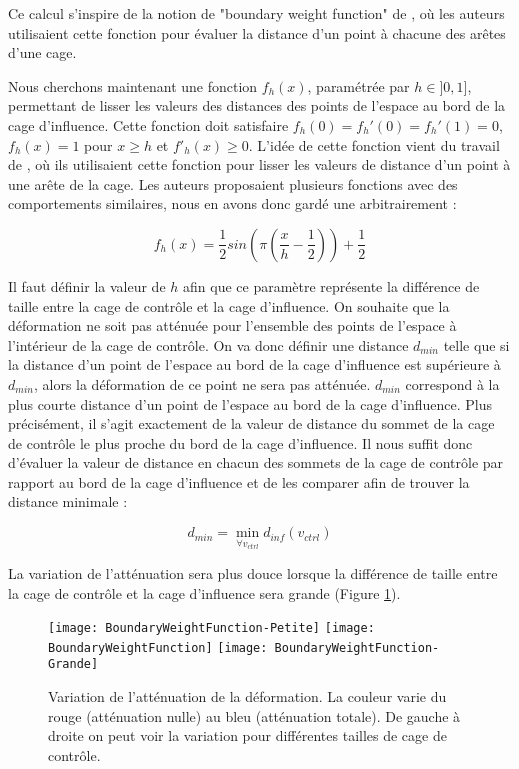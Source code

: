 Ce calcul s'inspire de la notion de "boundary weight function" de
\cite{GPCP13}, où les auteurs utilisaient cette fonction pour évaluer la
distance d'un point à chacune des arêtes d'une cage.

Nous cherchons maintenant une fonction $f_h(x)$, paramétrée par $h \in ]0,
1]$, permettant de lisser les valeurs des distances des points de l'espace au
bord de la cage d'influence. Cette fonction doit satisfaire $f_h(0) = f_h'(0)
= f_h'(1) = 0$, $f_h(x)=1$ pour $x \geq h$ et $f'_h(x) \geq 0$. L'idée de
cette fonction vient du travail de \cite{GPCP13}, où ils utilisaient cette
fonction pour lisser les valeurs de distance d'un point à une arête de la
cage. Les auteurs proposaient plusieurs fonctions avec des comportements
similaires, nous en avons donc gardé une arbitrairement :

\begin{equation}
  f_h(x) = \frac{1}{2} sin(\pi(\frac{x}{h} - \frac{1}{2})) + \frac{1}{2}
\end{equation}

Il faut définir la valeur de $h$ afin que ce paramètre représente la
différence de taille entre la cage de contrôle et la cage d'influence. On
souhaite que la déformation ne soit pas atténuée pour l'ensemble des points de
l'espace à l'intérieur de la cage de contrôle. On va donc définir une distance
$d_{min}$ telle que si la distance d'un point de l'espace au bord de la cage
d'influence est supérieure à $d_{min}$, alors la déformation de ce point ne
sera pas atténuée. $d_{min}$ correspond à la plus courte distance d'un point
de l'espace au bord de la cage d'influence. Plus précisément, il s'agit
exactement de la valeur de distance du sommet de la cage de contrôle le plus
proche du bord de la cage d'influence. Il nous suffit donc d'évaluer la valeur
de distance en chacun des sommets de la cage de contrôle par rapport au bord
de la cage d'influence et de les comparer afin de trouver la distance minimale
:

\begin{equation}
  d_{min} = \min_{\forall v_{ctrl}} d_{inf}(v_{ctrl})
\end{equation}

La variation de l'atténuation sera plus douce lorsque la différence de taille
entre la cage de contrôle et la cage d'influence sera grande (Figure
\ref{MELBou}).

\begin{figure}[ht]
  \begin{center}
    \texttt{[image: BoundaryWeightFunction-Petite]}
    \texttt{[image: BoundaryWeightFunction]}
    \texttt{[image: BoundaryWeightFunction-Grande]}

    \caption[Variation de l'atténuation de la déformation] {Variation de
l'atténuation de la déformation. La couleur varie du rouge (atténuation nulle)
au bleu (atténuation totale). De gauche à droite on peut voir la variation
pour différentes tailles de cage de contrôle.}

    \label{MELBou}
  \end{center}
\end{figure}

